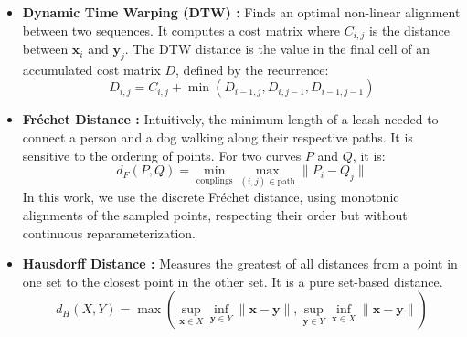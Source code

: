 \documentclass[a4paper,12pt]{article}
\begin{document}
\begin{itemize}
    \item \textbf{Dynamic Time Warping (DTW) \cite{SalvadorChan2007}:} Finds an optimal non-linear alignment between two sequences. It computes a cost matrix where $C_{i,j}$ is the distance between $\mathbf{x}_i$ and $\mathbf{y}_j$. The DTW distance is the value in the final cell of an accumulated cost matrix $D$, defined by the recurrence:
    \begin{equation}
        D_{i,j} = C_{i,j} + \min(D_{i-1, j}, D_{i, j-1}, D_{i-1, j-1})
    \end{equation}
    \item \textbf{Fréchet Distance \cite{Denaxas2023} \cite{EiterMannila1994}:} Intuitively, the minimum length of a leash needed to connect a person and a dog walking along their respective paths. It is sensitive to the ordering of points. For two curves $P$ and $Q$, it is:
        \begin{equation}
            d_F(P, Q) = \min_{\text{couplings}} \max_{(i, j) \in \text{path}} \| P_i - Q_j \|
        \end{equation}
        In this work, we use the discrete Fréchet distance, using monotonic alignments of the sampled points, respecting their order but without continuous reparameterization.
    \item \textbf{Hausdorff Distance \cite{SciPyDirectedHausdorff}:} Measures the greatest of all distances from a point in one set to the closest point in the other set. It is a pure set-based distance.
    \begin{equation}
        d_H(X, Y) = \max \left( \sup_{\mathbf{x} \in X} \inf_{\mathbf{y} \in Y} \|\mathbf{x}-\mathbf{y}\|, \sup_{\mathbf{y} \in Y} \inf_{\mathbf{x} \in X} \|\mathbf{x}-\mathbf{y}\| \right)
    \end{equation}
\end{itemize}
\end{document}

